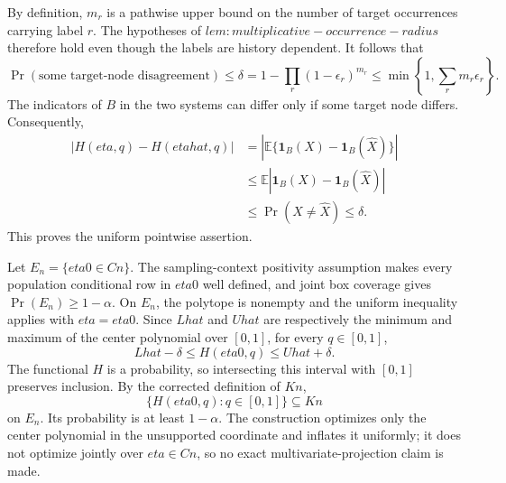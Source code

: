 By definition, \(m_r\) is a pathwise upper bound on the number of target occurrences carrying label \(r\).  The hypotheses of \(lem:multiplicative-occurrence-radius\) therefore hold even though the labels are history dependent.  It follows that
\[
 \Pr(\text{some target-node disagreement})
 \leq\delta
 =1-\prod_r(1-\epsilon_r)^{m_r}
 \leq\min\left\{1,\sum_rm_r\epsilon_r\right\}.
\]
The indicators of \(B\) in the two systems can differ only if some target node differs.  Consequently,
\[
 \begin{aligned}
 |H(eta,q)-H(etahat,q)|
 &=\left|\mathbb E\{\mathbf 1_B(X)-\mathbf 1_B(\widehat X)\}\right|\\
 &\leq\mathbb E|\mathbf 1_B(X)-\mathbf 1_B(\widehat X)|\\
 &\leq\Pr(X\neq\widehat X)\leq\delta.
 \end{aligned}
\]
This proves the uniform pointwise assertion.

Let \(E_n=\{eta0\in Cn\}\).  The sampling-context positivity assumption makes every population conditional row in \(eta0\) well defined, and joint box coverage gives \(\Pr(E_n)\geq1-\alpha\).  On \(E_n\), the polytope is nonempty and the uniform inequality applies with \(eta=eta0\).  Since \(Lhat\) and \(Uhat\) are respectively the minimum and maximum of the center polynomial over \([0,1]\), for every \(q\in[0,1]\),
\[
 Lhat-\delta\leq H(eta0,q)\leq Uhat+\delta.
\]
The functional \(H\) is a probability, so intersecting this interval with \([0,1]\) preserves inclusion.  By the corrected definition of \(Kn\),
\[
 \{H(eta0,q):q\in[0,1]\}\subseteq Kn
\]
on \(E_n\).  Its probability is at least \(1-\alpha\).  The construction optimizes only the center polynomial in the unsupported coordinate and inflates it uniformly; it does not optimize jointly over \(eta\in Cn\), so no exact multivariate-projection claim is made.
